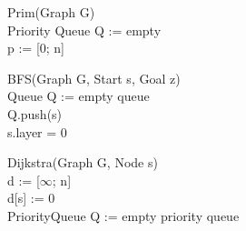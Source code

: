 \documentclass[11pt, a4paper, twoside]{article}
\begin{document}
\begin{minipage}{.25\linewidth}
    \begin{algorithm}[H]
        Prim(Graph G) \\
        Priority Queue Q := empty \\
        p := [0; n] \\
    \end{algorithm}
\end{minipage}
\begin{minipage}{.25\linewidth}
    \begin{algorithm}[H]
        BFS(Graph G, Start s, Goal z) \\
        Queue Q := empty queue \\
        Q.push(s) \\
        s.layer = 0 \\
    \end{algorithm}
\end{minipage}
\begin{minipage}{.25\linewidth}
    \begin{algorithm}[H]
        Dijkstra(Graph G, Node s) \\
        d := [$\infty$; n] \\
        d[s] := 0 \\
        PriorityQueue Q := empty priority queue \\
    \end{algorithm} 
\end{minipage}
\end{document}
